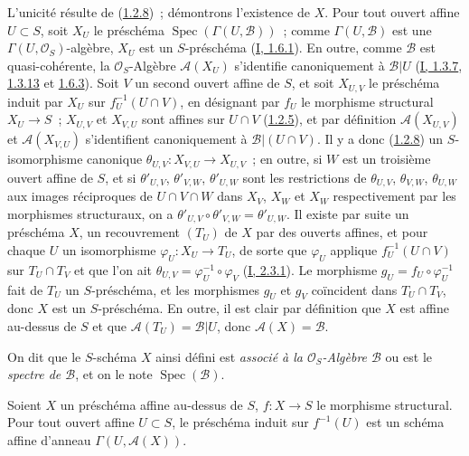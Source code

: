 L'unicité résulte de (\hyperref[II.1.2.8-fr]{1.2.8})~; démontrons l'existence
de $X$. Pour tout ouvert affine $U\subset S$, soit $X_U$ le préschéma
$\operatorname{Spec}(\Gamma(U,\mathcal{B}))$~; comme
$\Gamma(U,\mathcal{B})$ est une $\Gamma(U,\mathcal{O}_S)$-algèbre, $X_U$
est un $S$-préschéma (\hyperref[I.1.6.1-fr]{I, 1.6.1}). En outre, comme
$\mathcal{B}$ est quasi-cohérente, la $\mathcal{O}_S$-Algèbre
$\mathcal{A}(X_U)$ s'identifie canoniquement à $\mathcal{B}|U$
(\hyperref[I.1.3.7-fr]{I, 1.3.7},
\hyperref[I.1.3.13-fr]{1.3.13} et
\hyperref[I.1.6.3-fr]{1.6.3}). Soit $V$ un second ouvert affine de $S$, et
soit $X_{U,V}$ le préschéma induit par $X_U$ sur $f_U^{-1}(U\cap V)$, en
désignant par $f_U$ le morphisme structural $X_U\to S$~; $X_{U,V}$ et
$X_{V,U}$ sont affines sur $U\cap V$
(\hyperref[II.1.2.5-fr]{1.2.5}), et par définition $\mathcal{A}(X_{U,V})$
et $\mathcal{A}(X_{V,U})$ s'identifient canoniquement à
$\mathcal{B}|(U\cap V)$. Il y a donc
(\hyperref[II.1.2.8-fr]{1.2.8}) un $S$-isomorphisme canonique
$\theta_{U,V}:X_{V,U}\to X_{U,V}$~; en outre, si $W$ est un troisième
ouvert affine de $S$, et si $\theta'_{U,V}$, $\theta'_{V,W}$,
$\theta'_{U,W}$ sont les restrictions de $\theta_{U,V}$, $\theta_{V,W}$,
$\theta_{U,W}$ aux images réciproques de $U\cap V\cap W$ dans $X_V$,
$X_W$ et $X_W$ respectivement par les morphismes structuraux, on a
$\theta'_{U,V}\circ\theta'_{V,W}=\theta'_{U,W}$. Il existe par suite un
préschéma $X$, un recouvrement $(T_U)$ de $X$ par des ouverts affines, et
pour chaque $U$ un isomorphisme $\varphi_U:X_U\to T_U$, de sorte que
$\varphi_U$ applique $f_U^{-1}(U\cap V)$ sur $T_U\cap T_V$ et que l'on ait
$\theta_{U,V}=\varphi_U^{-1}\circ\varphi_V$
(\hyperref[I.2.3.1-fr]{I, 2.3.1}). Le morphisme
$g_U=f_U\circ\varphi_U^{-1}$ fait de $T_U$ un $S$-préschéma, et les
morphismes $g_U$ et $g_V$ coïncident dans $T_U\cap T_V$, donc $X$ est un
$S$-préschéma. En outre, il est clair par définition que $X$ est affine
au-dessus de $S$ et que $\mathcal{A}(T_U)=\mathcal{B}|U$, donc
$\mathcal{A}(X)=\mathcal{B}$.

On dit que le $S$-schéma $X$ ainsi défini est \emph{associé à la
$\mathcal{O}_S$-Algèbre $\mathcal{B}$} ou est le \emph{spectre de
$\mathcal{B}$}, et on le note $\operatorname{Spec}(\mathcal{B})$.

\begin{corollary}[1.3.2]
\label{II.1.3.2-fr}
Soient $X$ un préschéma affine au-dessus de $S$, $f:X\to S$ le morphisme
structural. Pour tout ouvert affine $U\subset S$, le préschéma induit sur
$f^{-1}(U)$ est un schéma affine d'anneau
$\Gamma(U,\mathcal{A}(X))$.
\end{corollary}


